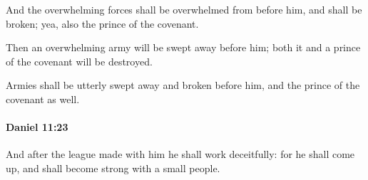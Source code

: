 			\begin{versebox}
					\item[BHS] 
					\item[LXX] 
					\item[ASV] And the overwhelming forces shall be overwhelmed from before him, and shall be broken; yea, also the prince of the covenant.
					\item[NIV] Then an overwhelming army will be swept away before him; both it and a prince of the covenant will be destroyed.
					\item[NRSV] Armies shall be utterly swept away and broken before him, and the prince of the covenant as well.
			\end{versebox}

		\paragraph{Daniel 11:23} %
			\label{DANIEL-11-23}

			And after the league made with him he shall work deceitfully: for he shall come up, and shall become strong with a small people.

